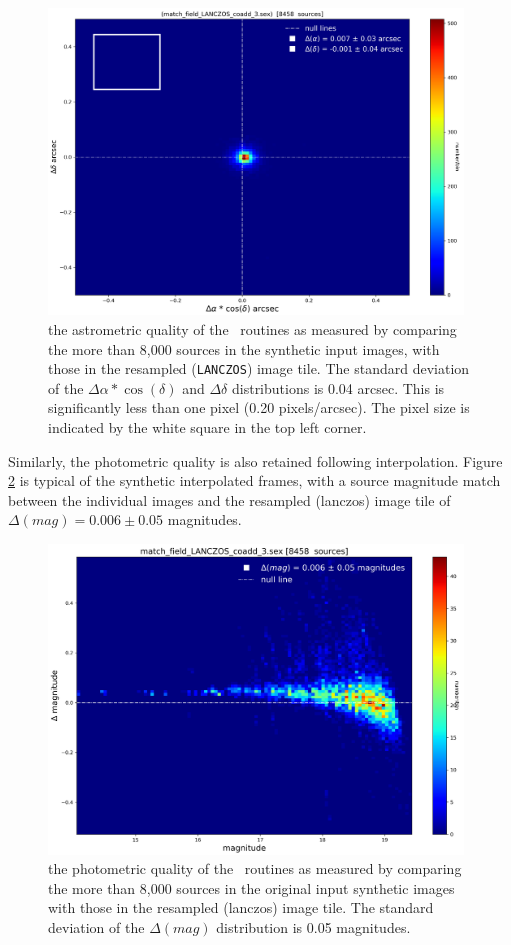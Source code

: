 \begin{figure}[H]
\centering
\includegraphics[width=11cm]{figures/match_field_LANCZOS_coadd_3_RA_DEC_scatter_plot.png}
\caption[]
	{\footnotesize  the astrometric quality of the \hdrlresample\ routines as measured by comparing the more than 8,000 sources in the synthetic input images,
	with those in the resampled ({\tt LANCZOS}) image tile.
	The standard deviation of the $\Delta\alpha*\cos(\delta)$ and $\Delta\delta$ distributions is 0.04 arcsec. This is significantly less than one
	pixel (0.20 pixels/arcsec).  The pixel size is indicated by the white square in the top left corner.
	}
	\label{fig:radec_synthetic}
\end{figure}

Similarly, the photometric quality is also retained following interpolation.   Figure \ref{fig:mag_synthetic} is typical of the synthetic interpolated frames, with a source magnitude match 
between the individual images and the resampled (lanczos) image tile of $\Delta(mag)=0.006\pm0.05$ magnitudes.

\begin{figure}[H]
\centering
\includegraphics[width=11cm]{figures/match_field_LANCZOS_coadd_3_mag_scatter_plot.png}
\caption[]
	{\footnotesize  the photometric quality of the \hdrlresample\ routines as measured by comparing the more than 8,000 sources in the original input synthetic images
	with those in the resampled (lanczos) image tile.
	The standard deviation of the $\Delta(mag)$  distribution is 0.05 magnitudes. 	
	}
	\label{fig:mag_synthetic}
\end{figure}

